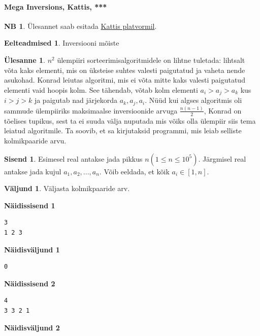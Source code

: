 \documentclass{trkut}
\theoremstyle{definition}
\newtheorem*{prereq}{Eelteadmised}
\newtheorem*{extra}{NB}
\newtheorem*{Input}{Sisend}
\newtheorem*{Output}{Väljund}
\newtheorem*{Text}{Ülesanne}
\begin{document}
\paragraph{Mega Inversions, Kattis, ***}
\begin{extra}
Ülesannet saab esitada \href{https://open.kattis.com/problems/megainversions}{Kattis platvormil}.
\end{extra}
\begin{prereq}
Inversiooni mõiste
\end{prereq}
\begin{Text}
$n^2$ ülempiiri sorteerimisalgoritmidele on lihtne tuletada: lihtsalt võta kaks elementi, mis on üksteise suhtes valesti paigutatud ja vaheta nende asukohad.
Konrad leiutas algoritmi, mis ei võta mitte kaks valesti paigutatud elementi vaid hoopis kolm. See tähendab, võtab kolm elementi $a_i>a_j>a_k$ kus $i>j>k$ ja paigutab nad järjekorda $a_k, a_j, a_i$. Nüüd kui algses algoritmis oli sammude ülempiiriks maksimaalse inversioonide arvuga $\frac{n(n-1)}{2}$, Konrad on tõelises tupikus, sest ta ei suuda välja nuputada mis võiks olla ülempiir siis tema leiatud algoritmile. Ta soovib, et sa kirjutaksid programmi, mis leiab selliste kolmikpaaride arvu.

\parencite{19}
\end{Text}
\begin{Input}
Esimesel real antakse jada pikkus $n$$(1\le n\le 10^5)$.
Järgmisel real antakse jada kujul $a_1, a_2, ..., a_n$. 
Võib eeldada, et kõik $a_i\in[1,n]$.
\end{Input}
\begin{Output}
Väljasta kolmikpaaride arv.
\end{Output}


\textbf{Näidissisend 1}

\begin{verbatim}
3
1 2 3
\end{verbatim}

\textbf{Näidisväljund 1}

\begin{verbatim}
0
\end{verbatim}





\textbf{Näidissisend 2}

\begin{verbatim}
4
3 3 2 1
\end{verbatim}

\textbf{Näidisväljund 2}
\end{document}
